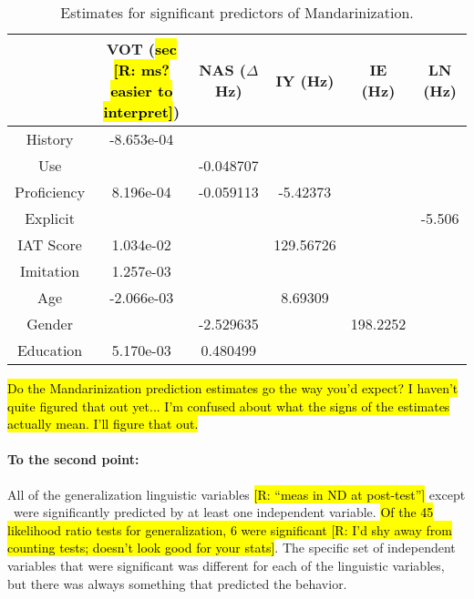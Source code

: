 \begin{table}[]
    \centering
    \begin{tabular}{|cccccc|}
        \hline
         & VOT (\hl{sec [R: ms? easier to interpret]}) & NAS ($\Delta$Hz) & IY (Hz) & IE (Hz) & LN (Hz)\\
        \hline
        History & -8.653e-04 & \cellcolor{lightgray} & \cellcolor{lightgray} & \cellcolor{lightgray} & \cellcolor{lightgray} \\
        Use & \cellcolor{lightgray} & -0.048707 & \cellcolor{lightgray} & \cellcolor{lightgray} & \cellcolor{lightgray} \\
        Proficiency & 8.196e-04 & -0.059113 & -5.42373 & \cellcolor{lightgray} & \cellcolor{lightgray} \\
        Explicit & \cellcolor{lightgray} & \cellcolor{lightgray} & \cellcolor{lightgray} & \cellcolor{lightgray} & -5.506 \\
        IAT Score & 1.034e-02 & \cellcolor{lightgray} & 129.56726 & \cellcolor{lightgray} & \cellcolor{lightgray} \\
        Imitation & 1.257e-03 & \cellcolor{lightgray} & \cellcolor{lightgray} & \cellcolor{lightgray} & \cellcolor{lightgray} \\
        Age & -2.066e-03 & \cellcolor{lightgray} & 8.69309 & \cellcolor{lightgray} & \cellcolor{lightgray} \\
        Gender & \cellcolor{lightgray} & -2.529635 & \cellcolor{lightgray} & 198.2252 & \cellcolor{lightgray} \\
        Education & 5.170e-03 & 0.480499 & \cellcolor{lightgray} & \cellcolor{lightgray} & \cellcolor{lightgray} \\
        \hline
    \end{tabular}
    \caption{Estimates for significant predictors of Mandarinization.}
    \label{tab:sigMandPredEsts}
\end{table}

\hl{Do the Mandarinization prediction estimates go the way you'd expect? I haven't quite figured that out yet... I'm confused about what the signs of the estimates actually mean. I'll figure that out.}

\paragraph{To the second point:}
All of the generalization linguistic variables \hl{[R: ``meas in ND at post-test'']} except \degdip~were significantly predicted by at least one independent variable. \hl{Of the 45 likelihood ratio tests for generalization, 6 were significant [R: I'd shy away from counting tests; doesn't look good for your stats]}. The specific set of independent variables that were significant was different for each of the linguistic variables, but there was always something that predicted the behavior.

